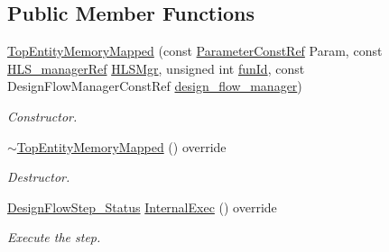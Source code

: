 \subsection*{Public Member Functions}
\begin{DoxyCompactItemize}
\item 
\hyperlink{classTopEntityMemoryMapped_a2c4aa04c1327b581f3ea9fb63ebfc8f4}{Top\+Entity\+Memory\+Mapped} (const \hyperlink{Parameter_8hpp_a37841774a6fcb479b597fdf8955eb4ea}{Parameter\+Const\+Ref} Param, const \hyperlink{hls__manager_8hpp_acd3842b8589fe52c08fc0b2fcc813bfe}{H\+L\+S\+\_\+manager\+Ref} \hyperlink{classHLS__step_ade85003a99d34134418451ddc46a18e9}{H\+L\+S\+Mgr}, unsigned int \hyperlink{classHLSFunctionStep_a3e6434fd86c698b0c70520b859bff5b0}{fun\+Id}, const Design\+Flow\+Manager\+Const\+Ref \hyperlink{classDesignFlowStep_ab770677ddf087613add30024e16a5554}{design\+\_\+flow\+\_\+manager})
\begin{DoxyCompactList}\small\item\em Constructor. \end{DoxyCompactList}\item 
\hyperlink{classTopEntityMemoryMapped_a6fe31df8802c62dda83459b8176349be}{$\sim$\+Top\+Entity\+Memory\+Mapped} () override
\begin{DoxyCompactList}\small\item\em Destructor. \end{DoxyCompactList}\item 
\hyperlink{design__flow__step_8hpp_afb1f0d73069c26076b8d31dbc8ebecdf}{Design\+Flow\+Step\+\_\+\+Status} \hyperlink{classTopEntityMemoryMapped_a33c5cbfe6f3cbd462a0f48e0a000674f}{Internal\+Exec} () override
\begin{DoxyCompactList}\small\item\em Execute the step. \end{DoxyCompactList}\end{DoxyCompactItemize}
